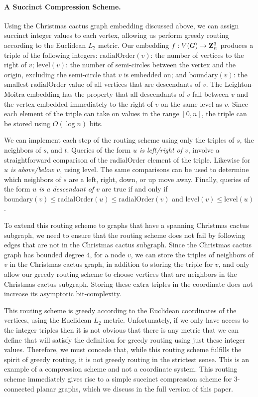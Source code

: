 \documentclass[11pt]{article}
\newcommand{\Z}{{\bf Z}}
\newcommand{\level}{\mathrm{level}}
\newcommand{\boundary}{\mathrm{boundary}}
\newcommand{\radialOrder}{\mathrm{radialOrder}}
\renewcommand{\subsection}[1]{\paragraph{#1.}}
\begin{document}
\subsection{A Succinct Compression Scheme}
Using the Christmas cactus graph embedding discussed above, we can assign 
succinct integer values to each vertex, allowing us perform greedy 
routing according to the Euclidean $L_2$ metric. Our embedding 
$f:V(G)\rightarrow \Z_{n}^3$ produces a triple of the following integers: 
$\radialOrder(v)$: the number of vertices to the right of $v$;
$\level(v)$: the number of semi-circles between the vertex 
and the origin, excluding the semi-circle that $v$ is embedded on; and
$\boundary(v)$: the smallest $\radialOrder$ value of all vertices that are 
descendants of $v$. The Leighton-Moitra embedding has the 
property that all descendants of $v$ fall between $v$ and the 
vertex embedded immediately to the right of $v$ on the same level as $v$. 
Since each element of the triple can take on values in the range $[0,n]$,
the triple can be stored using $O(\log n)$ bits.

We can implement each step of the routing scheme using only the 
triples of $s$, the neighbors of $s$, and $t$. Queries of the form 
\emph{$u$ is left/right of $v$}, involve a straightforward 
comparison of the $\radialOrder$ element of the triple. Likewise for \emph{$u$ is 
above/below $v$}, using $\level$. The same comparisons can be used to determine 
which neighbors of $s$ are a left, right, down, or 
up move away. Finally, queries of the form \emph{$u$ is a descendant
of $v$} are true if and only if $\boundary(v) \leq \radialOrder(u) \leq 
\radialOrder(v)$ and $\level(v) \leq \level(u)$. 

To extend this routing scheme to graphs that have a spanning Christmas cactus 
subgraph, we need to ensure that the routing scheme
does not fail by following edges that are not in the Christmas cactus subgraph. 
Since the Christmas cactus graph has bounded degree $4$, for a node $v$, we can 
store the triples of neighbors of $v$ in the Christmas cactus graph, in addition
to storing the triple for $v$, and only allow our greedy routing scheme to 
choose vertices that are neighbors in the Christmas cactus subgraph. Storing
these extra triples in the coordinate does not increase its asymptotic 
bit-complexity.

This routing scheme is greedy according to the Euclidean coordinates of the 
vertices, using the Euclidean $L_2$ metric. Unfortunately, if we only 
have access to the integer triples then it is not obvious that there 
is any metric that we can define that will satisfy the definition 
for greedy routing using just these integer values. Therefore, we must 
concede that, while this routing scheme fulfills the spirit of greedy 
routing, it is not greedy routing in the strictest sense. This is an 
example of a compression scheme and not a coordinate system.
\else
This routing scheme immediately gives rise to a simple 
succinct compression scheme for 3-connected planar graphs, which we discuss in
the full version of this paper. 
\fi
\end{document}

